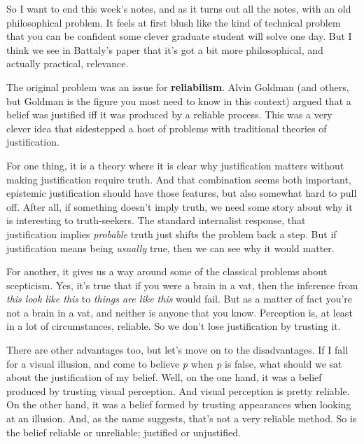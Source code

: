 \documentclass[
]{article}
\begin{document}
So I want to end this week's notes, and as it turns out all the notes,
with an old philosophical problem. It feels at first blush like the kind
of technical problem that you can be confident some clever graduate
student will solve one day. But I think we see in Battaly's paper that
it's got a bit more philosophical, and actually practical, relevance.

The original problem was an issue for \textbf{reliabilism}. Alvin
Goldman (and others, but Goldman is the figure you most need to know in
this context) argued that a belief was justified iff it was produced by
a reliable process. This was a very clever idea that sidestepped a host
of problems with traditional theories of justification.

For one thing, it is a theory where it is clear why justification
matters without making justification require truth. And that combination
seems both important, epistemic justification should have those
features, but also somewhat hard to pull off. After all, if something
doesn't imply truth, we need some story about why it is interesting to
truth-seekers. The standard internalist response, that justification
implies \emph{probable} truth just shifts the problem back a step. But
if justification means being \emph{usually} true, then we can see why it
would matter.

For another, it gives us a way around some of the classical problems
about scepticism. Yes, it's true that if you were a brain in a vat, then
the inference from \emph{this look like this} to \emph{things are like
this} would fail. But as a matter of fact you're not a brain in a vat,
and neither is anyone that you know. Perception is, at least in a lot of
circumstances, reliable. So we don't lose justification by trusting it.

There are other advantages too, but let's move on to the disadvantages.
If I fall for a visual illusion, and come to believe \emph{p} when
\emph{p} is false, what should we sat about the justification of my
belief. Well, on the one hand, it was a belief produced by trusting
visual perception. And visual perception is pretty reliable. On the
other hand, it was a belief formed by trusting appearances when looking
at an illusion. And, as the name suggests, that's not a very reliable
method. So is the belief reliable or unreliable; justified or
unjustified.
\end{document}
